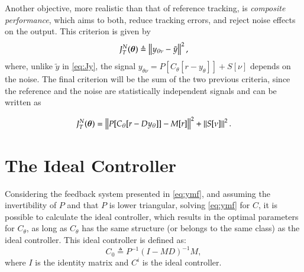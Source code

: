 Another objective, more realistic than that of reference tracking, is \textit{composite performance}, which aims to both, reduce tracking errors, and reject noise effects on the output. This criterion is given by
\begin{equation}
   J_T^N(\bm{\theta}) \triangleq \left\lVert y_{\theta\nu} - \tilde{y} \right\rVert^2,
   \label{eq:JT}
\end{equation}
where, unlike $\tilde{y}$ in \eqref{eq:Jy}, the signal $y_{\theta\nu}= P[C_\theta[r-y_\theta]] + S[\nu]$ depends on the noise. The final criterion will be the sum of the two previous criteria, since the reference and the noise are statistically independent signals and can be written as

\begin{equation}
   J_T^N(\bm{\theta}) = \left\lVert P[C_\theta[r-Dy_\theta]] - M[r] \right\rVert^{2} + \left\lVert S[\nu] \right\rVert^2.
   \label{eq:}
\end{equation}






\section{The Ideal Controller}%
\label{sec:ideal_controller}

Considering the feedback system presented in \eqref{eq:ymf}, and assuming the invertibility of $P$ and that $P$ is lower triangular, solving \eqref{eq:ymf} for $C$, it is possible to calculate the ideal controller, which results in the optimal parameters for $C_\theta$, as long as $C_\theta$ has the same structure (or belongs to the same class) as the ideal controller. This ideal controller is defined as:
\begin{equation}
   C_0 \triangleq P^{-1}(I-MD)^{-1}M,
\label{eq:}
\end{equation}
where $I$ is the identity matrix and $C^{i}$ is the ideal controller.

